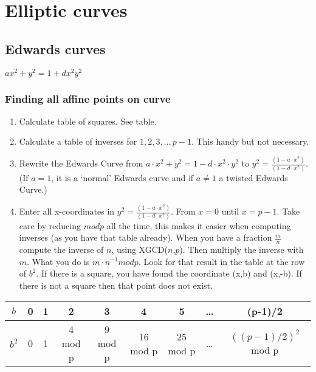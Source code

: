 \documentclass{article}
\begin{document}
\section{Elliptic curves}
\subsection{Edwards curves}
$ax^2+y^2 = 1 + dx^2y^2$

\subsubsection{Finding all affine points on curve}
\begin{enumerate}
\item Calculate table of squares. See table.
\item Calculate a table of inverses for $1,2,3,.., p-1$. This handy but not necessary.
\item Rewrite the Edwards Curve from $a \cdot x^2 + y^2 = 1 - d \cdot x^2 \cdot y^2$ to $y^2 = \frac{(1 - a \cdot x^2)}{(1-d \cdot x^2)}$. (If $a=1$, it is a `normal' Edwards curve and if $a\not= 1$ a twisted Edwards Curve.)
\item Enter all x-coordinates in $y^2 = \frac{(1 - a \cdot x^2)}{(1-d \cdot x^2)}$. From $x = 0$ until $x = p-1$. Take care by reducing $mod p$ all the time, this makes it easier when computing inverses (as you have that table already). When you have a fraction $\frac{m}{n}$ compute the inverse of $n$, using XGCD($n$,$p$). Then multiply the inverse with $m$. What you do is $m \cdot n^{-1} mod p$. Look for that result in the table at the row of $b^2$. If there is a square, you have found the coordinate (x,b) and (x,-b). If there is not a square then that point does not exist.

\end{enumerate}


\begin{tabular}{|c|c|c|c|c|c|c|c|c|}
\hline
$b $ & 0 & 1 & 2 & 3 & 4 & 5 & \ldots & (p-1)/2 \\
\hline
$b^2 $ & 0 & 1 & 4 mod p & 9 mod p & 16 mod p & 25 mod p & \ldots & $((p-1)/2)^2$ mod p \\
\hline
\end{tabular}
\end{document}
